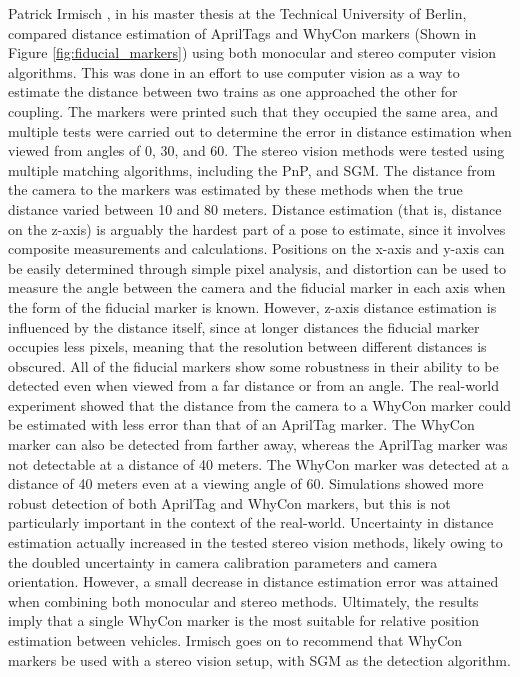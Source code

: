 Patrick Irmisch \cite{apriltag_whycon_comparison}, in his master thesis at the Technical University of Berlin, compared distance estimation of AprilTags and WhyCon markers (Shown in Figure \ref{fig:fiducial_markers}) using both monocular and stereo computer vision algorithms. This was done in an effort to use computer vision as a way to estimate the distance between two trains as one approached the other for coupling. The markers were printed such that they occupied the same area, and multiple tests were carried out to determine the error in distance estimation when viewed from angles of 0\degree, 30\degree, and 60\degree. The stereo vision methods were tested using multiple matching algorithms, including the \gls{PnP}, and \gls{SGM}. The distance from the camera to the markers was estimated by these methods when the true distance varied between 10 and 80 meters. Distance estimation (that is, distance on the z-axis) is arguably the hardest part of a pose to estimate, since it involves composite measurements and calculations. Positions on the x-axis and y-axis can be easily determined through simple pixel analysis, and distortion can be used to measure the angle between the camera and the fiducial marker in each axis when the form of the fiducial marker is known. However, z-axis distance estimation is influenced by the distance itself, since at longer distances the fiducial marker occupies less pixels, meaning that the resolution between different distances is obscured. All of the fiducial markers show some robustness in their ability to be detected even when viewed from a far distance or from an angle. The real-world experiment showed that the distance from the camera to a WhyCon marker could be estimated with less error than that of an AprilTag marker. The WhyCon marker can also be detected from farther away, whereas the AprilTag marker was not detectable at a distance of 40 meters. The WhyCon marker was detected at a distance of 40 meters even at a viewing angle of 60\degree. Simulations showed more robust detection of both AprilTag and WhyCon markers, but this is not particularly important in the context of the real-world. Uncertainty in distance estimation actually increased in the tested stereo vision methods, likely owing to the doubled uncertainty in camera calibration parameters and camera orientation. However, a small decrease in distance estimation error was attained when combining both monocular and stereo methods. Ultimately, the results imply that a single WhyCon marker is the most suitable for relative position estimation between vehicles. Irmisch goes on to recommend that WhyCon markers be used with a stereo vision setup, with \gls{SGM} as the detection algorithm.


